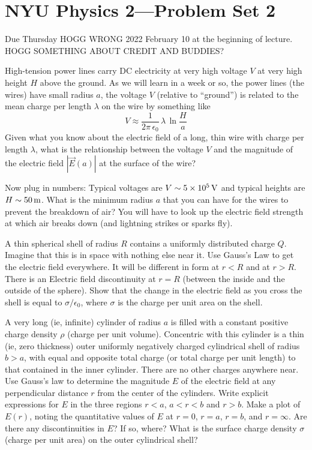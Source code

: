 \documentclass[12pt]{article}
\begin{document}
\section*{NYU Physics 2---Problem Set 2}

Due Thursday HOGG WRONG 2022 February 10 at the beginning of lecture. HOGG SOMETHING ABOUT CREDIT AND BUDDIES?

\startproblem%
High-tension power lines carry DC electricity at very high voltage $V$ at
very high height $H$ above the ground.
As we will learn in a week or so,
the power lines (the wires) have small radius $a$, the voltage $V$
(relative to ``ground'') is related
to the mean charge per length $\lambda$ on the wire
by something like
\begin{equation}
  V \approx \frac{1}{2\pi\,\epsilon_0}\,\lambda\,\ln\frac{H}{a}
\end{equation}
Given what you know about the electric field of a long, thin wire with
charge per length $\lambda$,
what is the relationship between the voltage $V$ and the magnitude of the electric
field $|\vec{E}(a)|$ at the surface of the wire?

Now plug in numbers:
Typical voltages are $V\sim 5\times 10^5\,\mathrm{V}$ and typical heights are
$H\sim 50\,\mathrm{m}$.
What is the minimum radius $a$ that you can have for the wires to prevent
the breakdown of air?
You will have to look up the electric field strength at which air breaks
down (and lightning strikes or sparks fly).

\startproblem%
A thin spherical shell of radius $R$ contains a uniformly distributed
charge $Q$.  Imagine that this is in space with nothing else near
it. Use Gauss's Law to get the electric field everywhere. It will be
different in form at $r<R$ and at $r>R$. There is an Electric field
discontinuity at $r=R$ (between the inside and the outside of the sphere). Show
that the change in the electric field as you cross the shell is equal
to $\sigma/\epsilon_0$, where $\sigma$ is the charge per unit area on
the shell.

\startproblem%
A very long (ie, infinite) cylinder of radius $a$ is filled with a
constant positive charge density $\rho$ (charge per unit volume).
Concentric with this cylinder is a thin (ie, zero thickness) outer
uniformly negatively charged cylindrical shell of radius $b>a$, with
equal and opposite total charge (or total charge per unit length) to that
contained in the inner cylinder.  There are no other charges anywhere near.  Use
Gauss's law to determine the magnitude $E$ of the electric field at
any perpendicular distance $r$ from the center of the cylinders.
Write explicit expressions for $E$ in the three regions $r<a$, $a<r<b$
and $r>b$.  Make a plot of $E(r)$, noting the quantitative values of
$E$ at $r=0$, $r=a$, $r=b$, and $r=\infty$.  Are there any
discontinuities in $E$?  If so, where?  What is the surface charge
density $\sigma$ (charge per unit area) on the outer cylindrical
shell?
\end{document}
